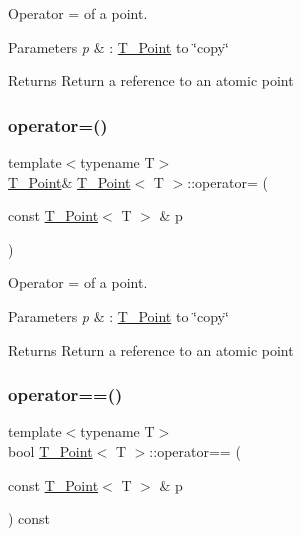 Operator = of a point. 


\begin{DoxyParams}{Parameters}
{\em p} & \+: \hyperlink{classT__Point}{T\+\_\+\+Point} to \char`\"{}copy\char`\"{} \\
\hline
\end{DoxyParams}
\begin{DoxyReturn}{Returns}
Return a reference to an atomic point 
\end{DoxyReturn}
\mbox{\label{classT__Point_a13fbb5646f2333aa41194d648423e10f}} 
\subsubsection{\texorpdfstring{operator=()}{operator=()}\hspace{0.1cm}{\footnotesize\ttfamily [2/2]}}
{\footnotesize\ttfamily template$<$typename T$>$ \\
\hyperlink{classT__Point}{T\+\_\+\+Point}\& \hyperlink{classT__Point}{T\+\_\+\+Point}$<$ T $>$\+::operator= (\begin{DoxyParamCaption}\item[{const \hyperlink{classT__Point}{T\+\_\+\+Point}$<$ T $>$ \&}]{p }\end{DoxyParamCaption})\hspace{0.3cm}{\ttfamily [inline]}}



Operator = of a point. 


\begin{DoxyParams}{Parameters}
{\em p} & \+: \hyperlink{classT__Point}{T\+\_\+\+Point} to \char`\"{}copy\char`\"{} \\
\hline
\end{DoxyParams}
\begin{DoxyReturn}{Returns}
Return a reference to an atomic point 
\end{DoxyReturn}
\mbox{\label{classT__Point_a83c15f53049523cc75c23350ceb4832a}} 
\subsubsection{\texorpdfstring{operator==()}{operator==()}\hspace{0.1cm}{\footnotesize\ttfamily [1/2]}}
{\footnotesize\ttfamily template$<$typename T$>$ \\
bool \hyperlink{classT__Point}{T\+\_\+\+Point}$<$ T $>$\+::operator== (\begin{DoxyParamCaption}\item[{const \hyperlink{classT__Point}{T\+\_\+\+Point}$<$ T $>$ \&}]{p }\end{DoxyParamCaption}) const\hspace{0.3cm}{\ttfamily [inline]}}



